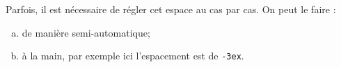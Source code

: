 \newpage





Parfois, il est nécessaire de régler cet espace au cas par cas. On peut le faire :
\begin{enumerate}[a.]
	\item de manière semi-automatique;
		\begin{LTXexample}[pos=o,width=.4]
		\end{LTXexample}
	
	\item à la main, par exemple ici l'espacement est de \texttt{-3ex}.
	   \begin{LTXexample}[pos=o,width=.4]
	\end{LTXexample}
\end{enumerate}